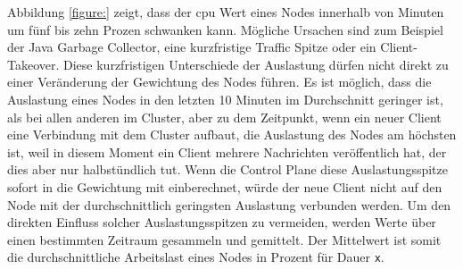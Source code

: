 Abbildung \ref{figure:} zeigt, dass der \ac{cpu} Wert eines Nodes innerhalb von Minuten um fünf bis zehn Prozen schwanken kann. Mögliche Ursachen sind zum Beispiel der Java Garbage Collector, eine kurzfristige Traffic Spitze oder ein Client-Takeover.
Diese kurzfristigen Unterschiede der Auslastung dürfen nicht direkt zu einer Veränderung der Gewichtung des Nodes führen. Es ist möglich, dass die Auslastung eines Nodes in den letzten 10 Minuten im Durchschnitt geringer ist, als bei allen anderen im Cluster, aber zu dem Zeitpunkt, wenn ein neuer Client eine Verbindung mit dem Cluster aufbaut, die Auslastung des Nodes am höchsten ist, weil in diesem Moment ein Client mehrere Nachrichten veröffentlich hat, der dies aber nur halbstündlich tut. Wenn die Control Plane diese Auslastungsspitze sofort in die Gewichtung mit einberechnet, würde der neue Client nicht auf den Node mit der durchschnittlich geringsten Auslastung verbunden werden.
Um den direkten Einfluss solcher Auslastungsspitzen zu vermeiden, werden Werte über einen bestimmten Zeitraum gesammeln und gemittelt. Der Mittelwert ist somit die durchschnittliche Arbeitslast eines Nodes in Prozent für Dauer \verb|x|.

